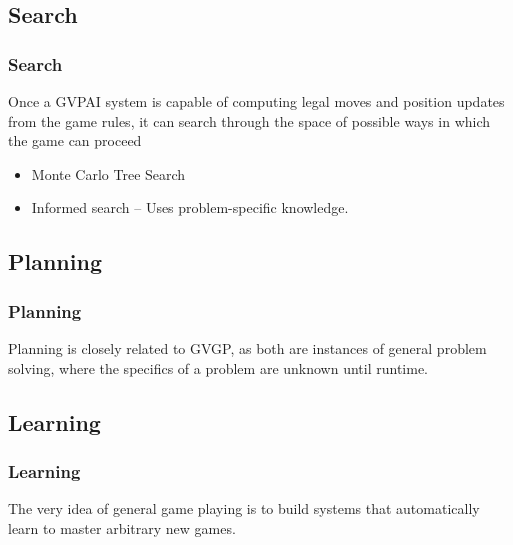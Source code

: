 \documentclass{beamer}
\begin{document}
\subsection{Search}
\begin{frame}
  \frametitle{Search\cite{12}}
  Once a GVPAI system is capable of computing legal moves and position updates from the game rules, it can search through the space of possible ways in which the game can proceed
  \begin{itemize}
    \item Monte Carlo Tree Search
    \item Informed search -- Uses problem-specific knowledge.
  \end{itemize}

\end{frame}

\subsection{Planning}
\begin{frame}
  \frametitle{Planning}
  Planning is closely related to GVGP, as both are instances of general problem solving, where the specifics of a problem are unknown until runtime.
\end{frame}

\subsection{Learning}
\begin{frame}
  \frametitle{Learning}
  The very idea of general game playing is to build systems that automatically learn to master arbitrary new games.


\end{frame}

\end{document}
